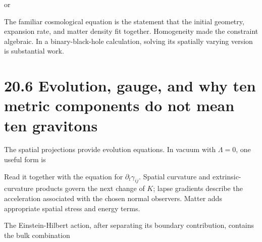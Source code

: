 \documentclass[
  11pt,
  letterpaper,
  oneside,
  openany]{scrbook}
\begin{document}
or

\begin{center}
\begingroup
{}
\ifdim\wd\grmathbox>\linewidth
\resizebox{\linewidth}{!}{\usebox{\grmathbox}}
\else\usebox{\grmathbox}\fi
\endgroup
\end{center}

The familiar cosmological equation is the statement that the initial
geometry, expansion rate, and matter density fit together. Homogeneity
made the constraint algebraic. In a binary-black-hole calculation,
solving its spatially varying version is substantial work.

\hypertarget{evolution-gauge-and-why-ten-metric-components-do-not-mean-ten-gravitons}{%
\section{20.6 Evolution, gauge, and why ten metric components do not
mean ten
gravitons}\label{evolution-gauge-and-why-ten-metric-components-do-not-mean-ten-gravitons}}

The spatial projections provide evolution equations. In vacuum with
\(\Lambda=0\), one useful form is

\begin{center}
\begingroup
{}
\ifdim\wd\grmathbox>\linewidth
\resizebox{\linewidth}{!}{\usebox{\grmathbox}}
\else\usebox{\grmathbox}\fi
\endgroup
\end{center}

Read it together with the equation for \(\partial_t\gamma_{ij}\).
Spatial curvature and extrinsic-curvature products govern the next
change of \(K\); lapse gradients describe the acceleration associated
with the chosen normal observers. Matter adds appropriate spatial stress
and energy terms.

The Einstein-Hilbert action, after separating its boundary contribution,
contains the bulk combination

\begin{center}
\begingroup
{}
\ifdim\wd\grmathbox>\linewidth
\resizebox{\linewidth}{!}{\usebox{\grmathbox}}
\else\usebox{\grmathbox}\fi
\endgroup
\end{center}
\end{document}
